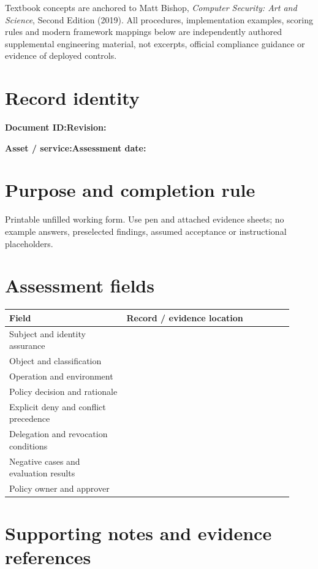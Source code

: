 \documentclass[10pt,letterpaper]{article}
\begin{document}
\makedoctocpage
\begin{notebox}
Textbook concepts are anchored to Matt Bishop, \emph{Computer Security: Art and Science}, Second Edition (2019). All procedures, implementation examples, scoring rules and modern framework mappings below are independently authored supplemental engineering material, not excerpts, official compliance guidance or evidence of deployed controls.
\end{notebox}
\section{Record identity}
\textbf{Document ID:}\enspace\hrulefill\quad\textbf{Revision:}\enspace\hrulefill
\par\medskip\textbf{Asset / service:}\enspace\hrulefill\quad\textbf{Assessment date:}\enspace\hrulefill
\section{Purpose and completion rule}
Printable unfilled working form. Use pen and attached evidence sheets; no example answers, preselected findings, assumed acceptance or instructional placeholders.
\section{Assessment fields}
\renewcommand{\arraystretch}{1.8}
\begin{longtable}{@{}p{0.38\linewidth}p{0.54\linewidth}@{}}
\toprule\textbf{Field}&\textbf{Record / evidence location}\\\midrule\endhead
Subject and identity assurance & \rule{0pt}{1.3cm}\\\midrule
Object and classification & \rule{0pt}{1.3cm}\\\midrule
Operation and environment & \rule{0pt}{1.3cm}\\\midrule
Policy decision and rationale & \rule{0pt}{1.3cm}\\\midrule
Explicit deny and conflict precedence & \rule{0pt}{1.3cm}\\\midrule
Delegation and revocation conditions & \rule{0pt}{1.3cm}\\\midrule
Negative cases and evaluation results & \rule{0pt}{1.3cm}\\\midrule
Policy owner and approver & \rule{0pt}{1.3cm}\\\midrule
\bottomrule\end{longtable}
\section{Supporting notes and evidence references}
\end{document}
